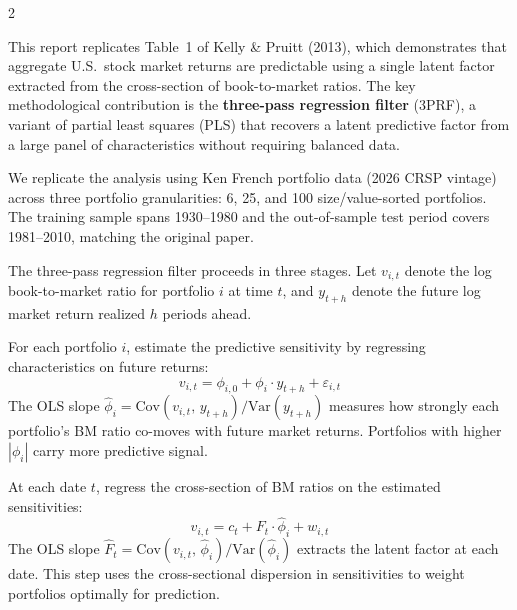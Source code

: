 \documentclass[10pt,letterpaper]{handout}
\begin{document}


\begin{fullwidth}
\makeheader
\end{fullwidth}

\begin{paracol}{2}


This report replicates Table~1 of Kelly \& Pruitt (2013), which demonstrates that aggregate U.S.\ stock market returns are predictable using a single latent factor extracted from the cross-section of book-to-market ratios.
The key methodological contribution is the \textbf{three-pass regression filter} (3PRF), a variant of partial least squares (PLS) that recovers a latent predictive factor from a large panel of characteristics without requiring balanced data.

\smallskip
We replicate the analysis using Ken French portfolio data (2026 CRSP vintage) across three portfolio granularities: 6, 25, and 100 size/value-sorted portfolios.
The training sample spans 1930--1980 and the out-of-sample test period covers 1981--2010, matching the original paper.

\divider

The three-pass regression filter proceeds in three stages. Let $v_{i,t}$ denote the log book-to-market ratio for portfolio $i$ at time $t$, and $y_{t+h}$ denote the future log market return realized $h$ periods ahead.

\smallskip
{}
For each portfolio $i$, estimate the predictive sensitivity by regressing characteristics on future returns:
\[
  v_{i,t} = \phi_{i,0} + \phi_i \cdot y_{t+h} + \varepsilon_{i,t}
\]
The OLS slope $\hat{\phi}_i = \text{Cov}(v_{i,t},\, y_{t+h}) / \text{Var}(y_{t+h})$ measures how strongly each portfolio's BM ratio co-moves with future market returns. Portfolios with higher $|\phi_i|$ carry more predictive signal.

\smallskip
{}
At each date $t$, regress the cross-section of BM ratios on the estimated sensitivities:
\[
  v_{i,t} = c_t + F_t \cdot \hat{\phi}_i + w_{i,t}
\]
The OLS slope $\hat{F}_t = \text{Cov}(v_{i,t},\, \hat{\phi}_i) / \text{Var}(\hat{\phi}_i)$ extracts the latent factor at each date. This step uses the cross-sectional dispersion in sensitivities to weight portfolios optimally for prediction.


\end{paracol}
\end{document}
